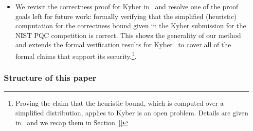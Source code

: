 \begin{itemize}[leftmargin=*]
  \item We revisit the correctness proof for Kyber in~\cite{} and resolve one of the proof goals left for future work: formally verifying that the simplified (heuristic) computation for the correctness bound given in the Kyber submission for the NIST PQC competition is correct. This shows the generality of our method and extends the formal verification results for Kyber~\cite{} to cover all of the formal claims that support its security.\footnote{Proving the claim that the heuristic bound, which is computed over a simplified distribution, applies to Kyber is an open problem. Details are given in~\cite{} and we recap them in Section~\ref{}}.
\end{itemize}

\subsubsection*{Structure of this paper}

